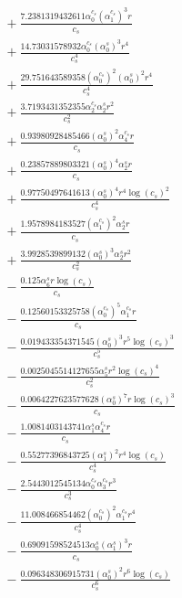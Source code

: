 \documentclass[10pt]{article}
\begin{document}
\begin{align*}
&{}  + \frac{7.2381319432611 \alpha_{0}^{c_s} \left(\alpha_{1}^{c_s}\right)^{3} r}{c_{s}} \\
&{}  + \frac{14.73031578932 \alpha_{0}^{c_s} \left(\alpha_{0}^s\right)^{3} r^{4}}{c_{s}^{4}} \\
&{}  + \frac{29.751643589358 \left(\alpha_{0}^{c_s}\right)^{2} \left(\alpha_{0}^s\right)^{2} r^{4}}{c_{s}^{4}} \\
&{}  + \frac{3.7193431352355 \alpha_{2}^{c_s} \alpha_{2}^s r^{2}}{c_{s}^{2}} \\
&{}  + \frac{0.93980928485466 \left(\alpha_{0}^s\right)^{2} \alpha_{4}^{c_s} r}{c_{s}} \\
&{}  + \frac{0.23857889803321 \left(\alpha_{0}^s\right)^{4} \alpha_{2}^s r}{c_{s}} \\
&{}  + \frac{0.97750497641613 \left(\alpha_{0}^s\right)^{4} r^{4} \log{\left(c_{s} \right)}^{2}}{c_{s}^{4}} \\
&{}  + \frac{1.9578984183527 \left(\alpha_{1}^{c_s}\right)^{2} \alpha_{2}^s r}{c_{s}} \\
&{}  + \frac{3.9928539899132 \left(\alpha_{0}^s\right)^{3} \alpha_{2}^s r^{2}}{c_{s}^{2}} \\
&{}  - \frac{0.125 \alpha_{6}^s r \log{\left(c_{s} \right)}}{c_{s}} \\
&{}  - \frac{0.12560153325758 \left(\alpha_{0}^{c_s}\right)^{5} \alpha_{1}^{c_s} r}{c_{s}} \\
&{}  - \frac{0.019433354371545 \left(\alpha_{0}^s\right)^{3} r^{5} \log{\left(c_{s} \right)}^{3}}{c_{s}^{5}} \\
&{}  - \frac{0.0025045514127655 \alpha_{5}^s r^{2} \log{\left(c_{s} \right)}^{4}}{c_{s}^{2}} \\
&{}  - \frac{0.0064227623577628 \left(\alpha_{0}^s\right)^{7} r \log{\left(c_{s} \right)}^{3}}{c_{s}} \\
&{}  - \frac{1.0081403143741 \alpha_{1}^s \alpha_{4}^{c_s} r}{c_{s}} \\
&{}  - \frac{0.55277396843725 \left(\alpha_{1}^s\right)^{2} r^{4} \log{\left(c_{s} \right)}}{c_{s}^{4}} \\
&{}  - \frac{2.5443012545134 \alpha_{0}^{c_s} \alpha_{3}^{c_s} r^{3}}{c_{s}^{3}} \\
&{}  - \frac{11.008466854462 \left(\alpha_{0}^{c_s}\right)^{2} \alpha_{1}^{c_s} r^{4}}{c_{s}^{4}} \\
&{}  - \frac{0.69091598524513 \alpha_{0}^s \left(\alpha_{1}^s\right)^{3} r}{c_{s}} \\
&{}  - \frac{0.096348306915731 \left(\alpha_{0}^s\right)^{2} r^{6} \log{\left(c_{s} \right)}}{c_{s}^{6}} \\

\end{align*}
\end{document}
